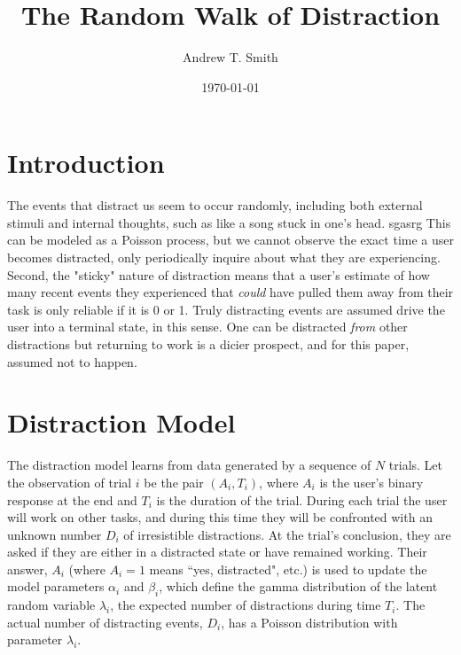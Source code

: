 \documentclass{article}
\begin{document}
\title{The Random Walk of Distraction}
\author{Andrew T. Smith}
\date{\today}
\maketitle

\section{Introduction}
The events that distract us seem to occur randomly, including both external stimuli and internal thoughts, such as like a song stuck in one's head.  sgasrg This can be modeled as a Poisson process, but we cannot observe the exact time a user becomes distracted, only periodically inquire about what they are experiencing.  Second, the "sticky" nature of distraction means that a user's estimate of how many recent events they experienced that \emph{could} have pulled them away from their task is only reliable if it is 0 or 1.  Truly distracting events are assumed drive the user into a terminal state, in this sense. One can be distracted \emph{from} other distractions but returning to work is a dicier prospect, and for this paper, assumed not to happen.

\section{Distraction Model}
The distraction model learns from data generated by a sequence of $N$ trials.  Let the observation of trial $i$ be the pair $(A_i, T_i)$, where $A_i$ is the user's binary response at the end and $T_i$ is the duration of the trial.  During each trial the user will work on other tasks, and during this time they will be confronted with an unknown number $D_i$ of irresistible distractions.  At the trial's conclusion, they are asked if they are either in a distracted state or have remained working.  Their answer, $A_i$ (where $A_i=1$ means ``yes, distracted", etc.) is used to update the model parameters $\alpha_i$ and $\beta_i$, which define the gamma distribution of the latent random variable  $\lambda_i$, the expected number of distractions during time $T_i$.  The actual number of distracting events, $D_i$, has a Poisson distribution with parameter $\lambda_i$.
\bigskip
\renewcommand{\arraystretch}{1.5}
\newcommand{\poisson}{{\rm Pr}}
\newcommand{\exponential}{{\rm Exp}}
\end{document}
